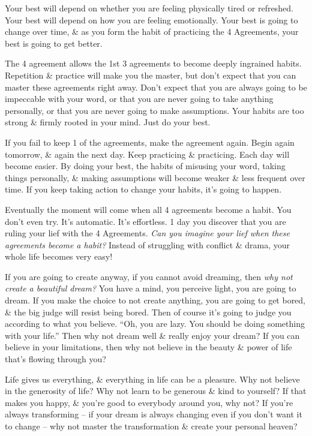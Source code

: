 \documentclass{article}
\numberwithin{equation}{section}
\begin{document}
Your best will depend on whether you are feeling physically tired or refreshed. Your best will depend on how you are feeling emotionally. Your best is going to change over time, \& as you form the habit of practicing the 4 Agreements, your best is going to get better.

The 4 agreement allows the 1st 3 agreements to become deeply ingrained habits. Repetition \& practice will make you the master, but don't expect that you can master these agreements right away. Don't expect that you are always going to be impeccable with your word, or that you are never going to take anything personally, or that you are never going to make assumptions. Your habits are too strong \& firmly rooted in your mind. Just do your best.

If you fail to keep 1 of the agreements, make the agreement again. Begin again tomorrow, \& again the next day. Keep practicing \& practicing. Each day will become easier. By doing your best, the habits of misusing your word, taking things personally, \& making assumptions will become weaker \& less frequent over time. If you keep taking action to change your habits, it's going to happen.

Eventually the moment will come when all 4 agreements become a habit. You don't even try. It's automatic. It's effortless. 1 day you discover that you are ruling your lief with the 4 Agreements. \textit{Can you imagine your lief when these agreements become a habit?} Instead of struggling with conflict \& drama, your whole life becomes very easy!

If you are going to create anyway, if you cannot avoid dreaming, then \textit{why not create a beautiful dream?} You have a mind, you perceive light, you are going to dream. If you make the choice to not create anything, you are going to get bored, \& the big judge will resist being bored. Then of course it's going to judge you according to what you believe. ``Oh, you are lazy. You should be doing something with your life.'' Then why not dream well \& really enjoy your dream? If you can believe in your limitations, then why not believe in the beauty \& power of life that's flowing through you?

Life gives us everything, \& everything in life can be a pleasure. Why not believe in the generosity of life? Why not learn to be generous \& kind to yourself? If that makes you happy, \& you're good to everybody around you, why not? If you're always transforming -- if your dream is always changing even if you don't want it to change -- why not master the transformation \& create your personal heaven?
\end{document}
